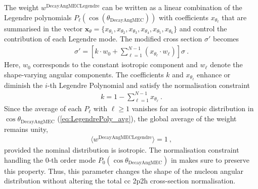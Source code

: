 The weight $w^\text{DecayAngMECLegendre}$ can be written as a linear combination of the Legendre polynomials $P_\ell(\cos(\theta_\text{DecayAngMEC}))$ with coefficients $x_{\theta_\ell}$ that are summarised in the vector $\mathbf{x}_\theta = \{{x_{\theta_1}, x_{\theta_2}, x_{\theta_3}, x_{\theta_4}, x_{\theta_5}, x_{\theta_6}}\}$ and control the contribution of each Legendre mode. The modified cross section $\sigma'$ becomes
%
\begin{align} \label{eq:ansatz_DecayAngMECLegendre_weight}
    \sigma' = \left[ k \cdot w_0 + \sum^{N-1}_{\ell=1} (x_{\theta_\ell} \cdot w_\ell) \right] \sigma \ \text{.}
\end{align}
%
Here, $w_0$ corresponds to the constant isotropic component and $w_\ell$ denote the shape-varying angular components. The coefficients $k$ and $x_{\theta_\ell}$ enhance or diminish the $i$-th Legendre Polynomial and satisfy the normalisation constraint
%
\begin{align} \label{eq:norm_constraint_DecayAngMECLegendre}
    k = 1 - \sum^{N-1}_{\ell=1} x_{\theta_\ell} \ \text{.}
\end{align}
%
Since the average of each $P_\ell$ with $\ell \geq 1$ vanishes for an isotropic distribution in $\cos\theta_\text{DecayAngMEC}$ (\ref{eq:LegendrePoly_avg}), the global average of the weight remains unity,
%
\begin{align}
    \langle w^\text{DecayAngMECLegendre} \rangle = 1 \ ,
\end{align}
%
provided the nominal distribution is isotropic. The normalisation constraint handling the $0$-th order mode $P_0(\cos\theta_\text{DecayAngMEC})$ in  makes sure to preserve this property. Thus, this parameter changes the shape of the nucleon angular distribution without altering the total \acrshort{cc} \acrshort{2p2h} cross-section normalisation. 

